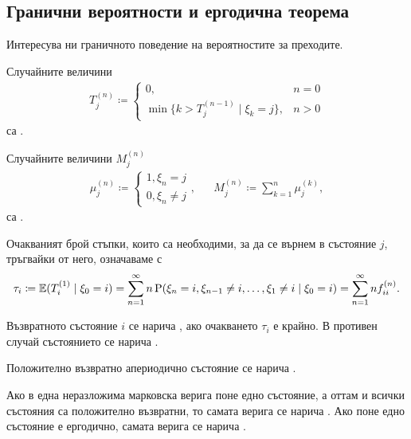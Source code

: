 \documentclass[numbers=endperiod, bibliography=totocnumbered]{scrartcl}
\begin{document}
\subsection{Гранични вероятности и ергодична теорема}

Интересува ни граничното поведение на вероятностите за преходите.

\begin{definition}
  Случайните величини
  \begin{align*}
    T_j^{(n)}
    \coloneqq
    \begin{cases}
      0, &n = 0 \\
      \min \{ k > T_j^{(n-1)} \mid \xi_k = j \}, &n > 0
    \end{cases}
  \end{align*}
  са .

  Случайните величини \( M_j^{(n)} \)
  \begin{align*}
    \mu_j^{(n)}
    \coloneqq
    \begin{cases}
      1, \xi_n = j \\
      0, \xi_n \neq j
    \end{cases},
    &&
    M_j^{(n)}
    \coloneqq
    \sum_{k=1}^n \mu_j^{(k)},
  \end{align*}
  са .

  Очакваният брой стъпки, които са необходими, за да се върнем в състояние \( j \), тръгвайки от него, означаваме с
  \begin{align*}
    \tau_i
    \coloneqq
    \mathbb{E}(T_i^{(1)} \mid \xi_0 = i)
    =
    \sum_{n=1}^\infty n \operatorname{P}(\xi_n = i, \xi_{n-1} \neq i, \ldots, \xi_1 \neq i \mid \xi_0 = i)
    =
    \sum_{n=1}^\infty n f^{(n)}_{ii}.
  \end{align*}
\end{definition}

\begin{definition}
  Възвратното състояние \( i \) се нарича , ако очакването \( \tau_i \) е крайно. В противен случай състоянието се нарича .

  Положително възвратно апериодично състояние се нарича .

  Ако в една неразложима марковска верига поне едно състояние, а оттам и всички състояния са положително възвратни, то самата верига се нарича . Ако поне едно състояние е ергодично, самата верига се нарича .
\end{definition}
\end{document}
